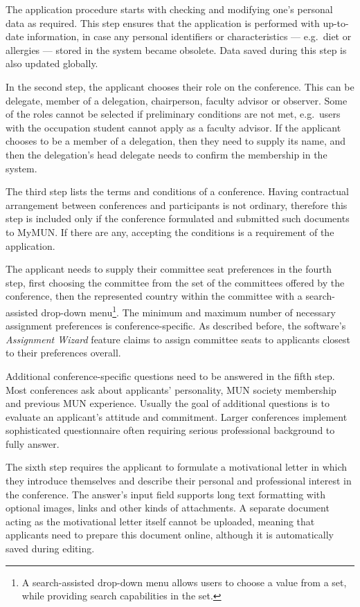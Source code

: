 The application procedure starts with checking and modifying one's personal data as required. This step ensures that the application is performed with up-to-date information, in case any personal identifiers or characteristics — e.g.\ diet or allergies — stored in the system became obsolete. Data saved during this step is also updated globally.

In the second step, the applicant chooses their role on the conference. This can be delegate, member of a delegation, chairperson, faculty advisor or observer. Some of the roles cannot be selected if preliminary conditions are not met, e.g.\ users with the occupation student cannot apply as a faculty advisor. If the applicant chooses to be a member of a delegation, then they need to supply its name, and then the delegation's head delegate needs to confirm the membership in the system.

The third step lists the terms and conditions of a conference. Having contractual arrangement between conferences and participants is not ordinary, therefore this step is included only if the conference formulated and submitted such documents to MyMUN. If there are any, accepting the conditions is a requirement of the application.

The applicant needs to supply their committee seat preferences in the fourth step, first choosing the committee from the set of the committees offered by the conference, then the represented country within the committee with a search-assisted drop-down menu\footnote{A search-assisted drop-down menu allows users to choose a value from a set, while providing search capabilities in the set.}. The minimum and maximum number of necessary assignment preferences is conference-specific. As described before, the software's \emph{Assignment Wizard} feature claims to assign committee seats to applicants closest to their preferences overall.

Additional conference-specific questions need to be answered in the fifth step. Most conferences ask about applicants' personality, MUN society membership and previous MUN experience. Usually the goal of additional questions is to evaluate an applicant's attitude and commitment. Larger conferences implement sophisticated questionnaire often requiring serious professional background to fully answer.

The sixth step requires the applicant to formulate a motivational letter in which they introduce themselves and describe their personal and professional interest in the conference. The answer's input field supports long text formatting with optional images, links and other kinds of attachments. A separate document acting as the motivational letter itself cannot be uploaded, meaning that applicants need to prepare this document online, although it is automatically saved during editing.

